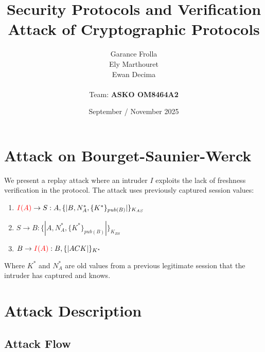\documentclass[11pt]{article}
\begin{document}
    \title{
            { \textbf{Security Protocols and Verification}} \\[1ex]
        {\small Attack of Cryptographic Protocols}
    }


    \author{
        Garance Frolla \\
        Ely Marthouret \\
        Ewan Decima\\ \\
        Team: \textbf{ASKO OM8464A2}
    }

    \date{September / November 2025}


    \maketitle
    \tableofcontents
    \newpage



    \section{Attack on Bourget-Saunier-Werck}


    We present a replay attack where an intruder $I$ exploits the lack of freshness verification in the protocol. The attack uses previously captured session values:

    \begin{enumerate}
        \item $\textcolor{red}{I(A)} \rightarrow S : A, \{| B, N_A^*, \{K^*\}_{pub(B)} |\}_{K_{AS}}$
        \item $S \rightarrow B : \{| A, N_A^*, \{K^*\}_{pub(B)} |\}_{K_{BS}}$
        \item $B \rightarrow \textcolor{red}{I(A)} : B, \{| ACK |\}_{K^*}$
    \end{enumerate}

    Where $K^*$ and $N_A^*$ are old values from a previous legitimate session that the intruder has captured and knows.

    \section{Attack Description}

    \subsection{Attack Flow}
\end{document}
